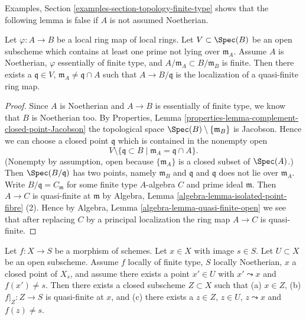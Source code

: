 \noindent
Examples, Section \ref{examples-section-topology-finite-type}
shows that the following lemma is false if $A$ is not assumed
Noetherian.

\begin{lemma}
\label{lemma-quasi-finite-quasi-section-meeting-nearby-open}
Let $\varphi : A \to B$ be a local ring map of local rings.
Let $V \subset \Spec(B)$ be an open subscheme
which contains at least one prime not lying over $\mathfrak m_A$.
Assume $A$ is Noetherian, $\varphi$ essentially of finite type, and
$A/\mathfrak m_A \subset B/\mathfrak m_B$ is finite.
Then there exists a $\mathfrak q \in V$,
$\mathfrak m_A \not = \mathfrak q \cap A$ such that
$A \to B/\mathfrak q$ is the localization of a quasi-finite ring map.
\end{lemma}

\begin{proof}
Since $A$ is Noetherian and $A \to B$ is essentially of finite type,
we know that $B$ is Noetherian too. By
Properties, Lemma \ref{properties-lemma-complement-closed-point-Jacobson}
the topological space $\Spec(B) \setminus \{\mathfrak m_B\}$
is Jacobson. Hence we can choose a closed point $\mathfrak q$
which is contained in the nonempty open
$$
V \setminus \{\mathfrak q \subset B \mid \mathfrak m_A = \mathfrak q \cap A\}.
$$
(Nonempty by assumption, open because $\{\mathfrak m_A\}$ is a closed
subset of $\Spec(A)$.)
Then $\Spec(B/\mathfrak q)$ has two points, namely $\mathfrak m_B$
and $\mathfrak q$ and $\mathfrak q$ does not lie over $\mathfrak m_A$.
Write $B/\mathfrak q = C_{\mathfrak m}$ for some finite type $A$-algebra
$C$ and prime ideal $\mathfrak m$. Then $A \to C$ is quasi-finite at
$\mathfrak m$ by
Algebra, Lemma \ref{algebra-lemma-isolated-point-fibre} (2).
Hence by
Algebra, Lemma \ref{algebra-lemma-quasi-finite-open}
we see that after replacing $C$ by a principal localization the ring
map $A \to C$ is quasi-finite.
\end{proof}

\begin{lemma}
\label{lemma-quasi-finite-quasi-section-meeting-nearby-open-X}
Let $f : X \to S$ be a morphism of schemes.
Let $x \in X$ with image $s \in S$.
Let $U \subset X$ be an open subscheme.
Assume $f$ locally of finite type, $S$ locally Noetherian, $x$ a closed
point of $X_s$, and assume there exists a point $x' \in U$ with
$x' \leadsto x$ and $f(x') \not = s$. Then there exists a closed
subscheme $Z \subset X$ such that (a) $x \in Z$, (b) $f|_Z : Z \to S$ is
quasi-finite at $x$, and (c) there exists a $z \in Z$, $z \in U$,
$z \leadsto x$ and $f(z) \not = s$.
\end{lemma}

